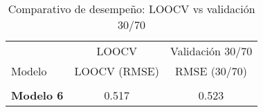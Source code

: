 \begin{table}[!h]
\centering
\caption{Comparativo de desempeño: LOOCV vs validación 30/70}
\centering
\begin{tabular}[t]{>{}lcc}
\toprule
\multicolumn{1}{c}{ } & \multicolumn{1}{c}{LOOCV} & \multicolumn{1}{c}{Validación 30/70} \\
\cmidrule(l{3pt}r{3pt}){2-2} \cmidrule(l{3pt}r{3pt}){3-3}
Modelo & LOOCV (RMSE) & RMSE (30/70)\\
\midrule
\textbf{\cellcolor{gray!10}{Modelo 5}} & \cellcolor{gray!10}{0.520} & \cellcolor{gray!10}{0.525}\\
\textbf{Modelo 6} & 0.517 & 0.523\\
\bottomrule
\end{tabular}
\end{table}